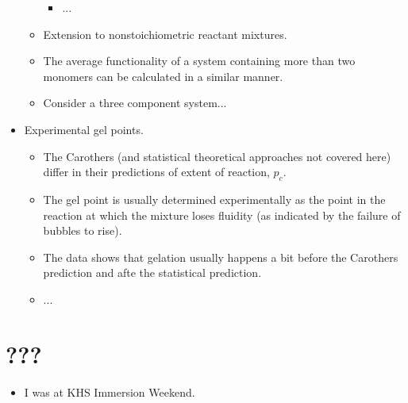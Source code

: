 \documentclass[../notes.tex]{subfiles}
\begin{document}
\begin{itemize}
\begin{itemize}
        \begin{itemize}
            \item ...
        \end{itemize}
        \item Extension to nonstoichiometric reactant mixtures.
        \item The average functionality of a system containing more than two monomers can be calculated in a similar manner.
        \item Consider a three component system...
    \end{itemize}
    \item Experimental gel points.
    \begin{itemize}
        \item The Carothers (and statistical theoretical approaches not covered here) differ in their predictions of extent of reaction, $p_c$.
        \item The gel point is usually determined experimentally as the point in the reaction at which the mixture loses fluidity (as indicated by the failure of bubbles to rise).
        \item The data shows that gelation usually happens a bit before the Carothers prediction and afte the statistical prediction.
        \item ...
    \end{itemize}
\end{itemize}



\section{???}
\begin{itemize}
    \item {}I was at KHS Immersion Weekend.
\end{itemize}
\end{document}

